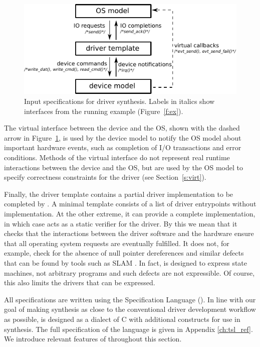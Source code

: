 \begin{figure}
    \center
    \includegraphics[width=0.85\linewidth]{imgs/actions.pdf}
    \caption{Input specifications for driver synthesis.  
    Labels in italics show interfaces from the running example
    (Figure~\ref{f:ex}).}\label{f:actions}
\end{figure}

The virtual interface between the device and the OS, shown with the dashed arrow in Figure~\ref{f:actions}, is used by the device model to notify the OS model about important hardware events, such as completion of I/O transactions and error conditions.  Methods of the virtual interface do not represent real runtime interactions between the device and the OS, but are used by the OS model to specify correctness constraints for the driver (see Section~\ref{s:virt}).

Finally, the driver template contains a partial driver implementation to be completed by \termite.  A minimal template consists of a list of driver entrypoints without implementation.  At the other extreme, it can provide a complete implementation, in which case \termite acts as a static verifier for the driver. By this we mean that it checks that the interactions between the driver software and the hardware ensure that all operating system requests are eventually fulfilled. It does not, for example, check for the absence of null pointer dereferences and similar defects that can be found by tools such as SLAM \cite{slam}. In fact, \tsl is designed to express state machines, not arbitrary programs and such defects are not expressible. Of course, this also limits the drivers that can be expressed.

All specifications are written using the \termite Specification Language (\tsl).  In line with our goal of making synthesis as close to the conventional driver development workflow as possible, \tsl is designed as a dialect of C with additional constructs for use in synthesis.  The full specification of the \tsl language is given in Appendix \ref{ch:tsl_ref}. We introduce relevant features of \tsl throughout this section.

